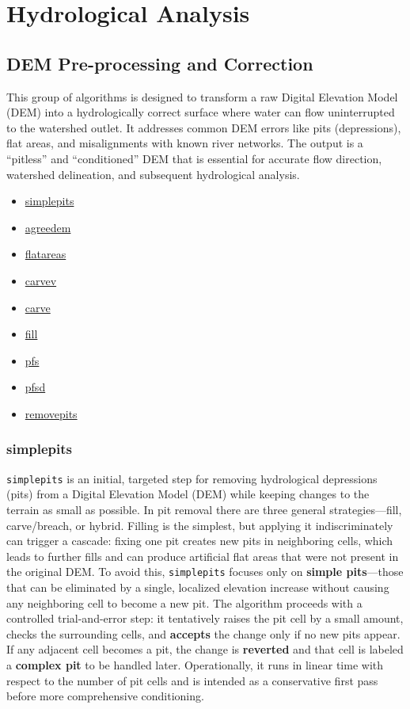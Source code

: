 \documentclass[
]{book}
\providecommand{\tightlist}{%
  \setlength{\itemsep}{0pt}\setlength{\parskip}{0pt}}
\theoremstyle{definition}
\theoremstyle{definition}
\theoremstyle{definition}
\theoremstyle{definition}
\theoremstyle{remark}
\begin{document}
\chapter{Hydrological Analysis}\label{hydrological-analysis}

\section{DEM Pre-processing and Correction}\label{DEM-Pre-processing-and-Correction}

This group of algorithms is designed to transform a raw Digital Elevation Model (DEM) into a hydrologically correct surface where water can flow uninterrupted to the watershed outlet. It addresses common DEM errors like pits (depressions), flat areas, and misalignments with known river networks. The output is a ``pitless'' and ``conditioned'' DEM that is essential for accurate flow direction, watershed delineation, and subsequent hydrological analysis.

\begin{itemize}
\tightlist
\item
  \hyperref[simplepits]{simplepits}
\item
  \hyperref[agreedem]{agreedem}
\item
  \hyperref[flatareas]{flatareas}
\item
  \hyperref[carvev]{carvev}
\item
  \hyperref[carve]{carve}
\item
  \hyperref[fill]{fill}
\item
  \hyperref[pfs]{pfs}
\item
  \hyperref[pfsd]{pfsd}
\item
  \hyperref[removepits]{removepits}
\end{itemize}

\subsection{simplepits}\label{simplepits}

\texttt{simplepits} is an initial, targeted step for removing hydrological depressions (pits) from a Digital Elevation Model (DEM) while keeping changes to the terrain as small as possible. In pit removal there are three general strategies---fill, carve/breach, or hybrid. Filling is the simplest, but applying it indiscriminately can trigger a cascade: fixing one pit creates new pits in neighboring cells, which leads to further fills and can produce artificial flat areas that were not present in the original DEM. To avoid this, \texttt{simplepits} focuses only on \textbf{simple pits}---those that can be eliminated by a single, localized elevation increase without causing any neighboring cell to become a new pit. The algorithm proceeds with a controlled trial-and-error step: it tentatively raises the pit cell by a small amount, checks the surrounding cells, and \textbf{accepts} the change only if no new pits appear. If any adjacent cell becomes a pit, the change is \textbf{reverted} and that cell is labeled a \textbf{complex pit} to be handled later. Operationally, it runs in linear time with respect to the number of pit cells and is intended as a conservative first pass before more comprehensive conditioning.
\end{document}
